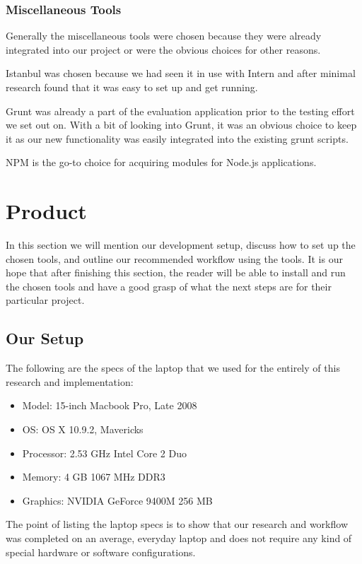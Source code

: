 \documentclass[12pt]{ucthesis}
\begin{document}
\subsection{Miscellaneous Tools}
Generally the miscellaneous tools were chosen because they were already integrated into our project or were the obvious choices for other reasons.

Istanbul was chosen because we had seen it in use with Intern and after minimal research found that it was easy to set up and get running.

Grunt was already a part of the evaluation application prior to the testing effort we set out on. With a bit of looking into Grunt, it was an obvious choice to keep it as our new functionality was easily integrated into the existing grunt scripts.

NPM is the go-to choice for acquiring modules for Node.js applications.

\chapter{Product}
In this section we will mention our development setup, discuss how to set up the chosen tools, and outline our recommended workflow using the tools. It is our hope that after finishing this section, the reader will be able to install and run the chosen tools and have a good grasp of what the next steps are for their particular project.

\section{Our Setup}
The following are the specs of the laptop that we used for the entirely of this research and implementation:
\begin{itemize}
  \item Model: 15-inch Macbook Pro, Late 2008
  \item OS: OS X 10.9.2, Mavericks
  \item Processor: 2.53 GHz Intel Core 2 Duo
  \item Memory: 4 GB 1067 MHz DDR3
  \item Graphics: NVIDIA GeForce 9400M 256 MB
\end{itemize}
The point of listing the laptop specs is to show that our research and workflow was completed on an average, everyday laptop and does not require any kind of special hardware or software configurations.
\end{document}
